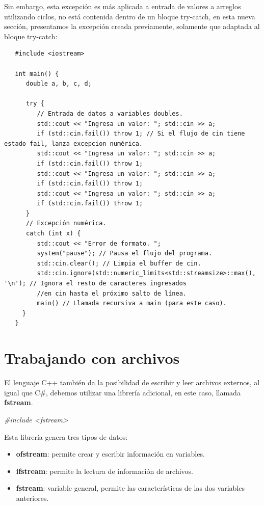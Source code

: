 Sin embargo, esta excepción es más aplicada a entrada de valores a arreglos utilizando ciclos, no está contenida dentro de un bloque try-catch, en esta nueva sección, presentamos la excepción creada previamente, solamente que adaptada al bloque try-catch:
\begin{lstlisting}
   #include <iostream>

   int main() {
      double a, b, c, d;

      try {
         // Entrada de datos a variables doubles.
         std::cout << "Ingresa un valor: "; std::cin >> a;
         if (std::cin.fail()) throw 1; // Si el flujo de cin tiene estado fail, lanza excepcion numérica.
         std::cout << "Ingresa un valor: "; std::cin >> a;
         if (std::cin.fail()) throw 1;
         std::cout << "Ingresa un valor: "; std::cin >> a;
         if (std::cin.fail()) throw 1;
         std::cout << "Ingresa un valor: "; std::cin >> a;
         if (std::cin.fail()) throw 1;
      }
      // Excepción numérica.
      catch (int x) {
         std::cout << "Error de formato. ";
         system("pause"); // Pausa el flujo del programa.
         std::cin.clear(); // Limpia el buffer de cin.
         std::cin.ignore(std::numeric_limits<std::streamsize>::max(), '\n'); // Ignora el resto de caracteres ingresados
         //en cin hasta el próximo salto de línea.
         main() // Llamada recursiva a main (para este caso).
     }
   }
\end{lstlisting}



\section{Trabajando con archivos}
\hspace{0.55cm}El lenguaje C++ también da la posibilidad de escribir y leer archivos externos, al igual que C\#, debemos utilizar una librería adicional, en este caso, llamada \textbf{fstream}.
\begin{center}
	\textit{\#include <fstream>}
\end{center}

Esta librería genera tres tipos de datos:
\begin{itemize}
    \item \textbf{ofstream}: permite crear y escribir información en variables.
    \item \textbf{ifstream}: permite la lectura de información de archivos.
    \item \textbf{fstream}: variable general, permite las características de las dos variables anteriores.
\end{itemize}

